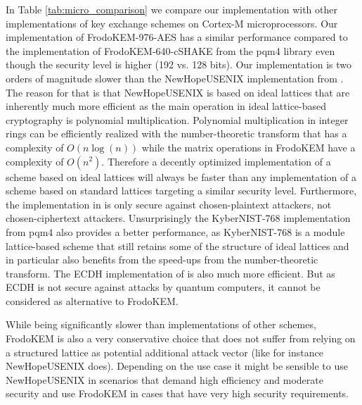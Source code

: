 In Table \ref{tab:micro_comparison} we compare our implementation with other implementations of key exchange schemes on Cortex-M microprocessors. Our implementation of \textsf{FrodoKEM-976-AES} has a similar performance compared to the implementation of \textsf{FrodoKEM-640-cSHAKE} from the pqm4 library \cite{pqm4} even though the security level is higher (192 vs. 128 bits). Our implementation is two orders of magnitude slower than the \textsf{NewHopeUSENIX} implementation from \cite{alkim2016newhope}. The reason for that is that \textsf{NewHopeUSENIX} is based on ideal lattices that are inherently much more efficient as the main operation in ideal lattice-based cryptography is polynomial multiplication. Polynomial multiplication in integer rings can be efficiently realized with the number-theoretic transform that has a complexity of $O(n \log (n))$ while the matrix operations in \textsf{FrodoKEM} have a complexity of $O(n^2)$. Therefore a decently optimized implementation of a scheme based on ideal lattices will always be faster than any implementation of a scheme based on standard lattices targeting a similar security level. Furthermore, the implementation in \cite{alkim2016newhope} is only secure against chosen-plaintext attackers, not chosen-ciphertext attackers. Unsurprisingly the \textsf{KyberNIST-768} implementation from pqm4 also provides a better performance, as \textsf{KyberNIST-768} is a module lattice-based scheme that still retains some of the structure of ideal lattices and in particular also benefits from the speed-ups from the number-theoretic transform. The ECDH implementation of \cite{DBLP:journals/dcc/DullHHHPSS15} is also much more efficient. But as ECDH is not secure against attacks by quantum computers, it cannot be considered as alternative to \textsf{FrodoKEM}.

While being significantly slower than implementations of other schemes, \textsf{FrodoKEM} is also a very conservative choice that does not suffer from relying on a structured lattice as potential additional attack vector (like for instance \textsf{NewHopeUSENIX} does). Depending on the use case it might be sensible to use \textsf{NewHopeUSENIX} in scenarios that demand high efficiency and moderate security and use \textsf{FrodoKEM} in cases that have very high security requirements.